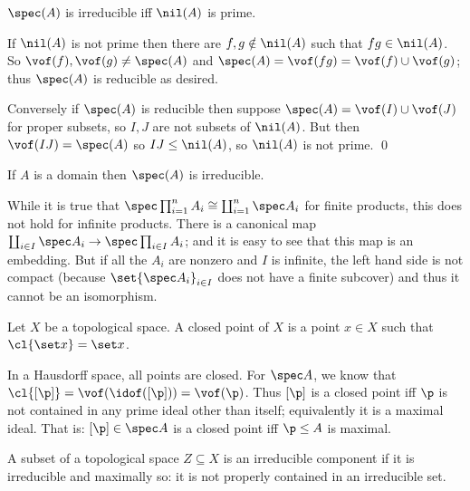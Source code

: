 \eproof

\bprop[name={irredaffine}]

    $\spec(A)$ is irreducible iff $\nil(A)$ is prime.

\eprop

\bproof

    If $\nil(A)$ is not prime then there are $f,g\notin\nil(A)$ such that $fg\in\nil(A)$.
    So $\vof(f),\vof(g)\neq\spec(A)$ and $\spec(A)=\vof(fg)=\vof(f)\cup\vof(g)$; thus $\spec(A)$ is reducible as desired.

    Conversely if $\spec(A)$ is reducible then suppose $\spec(A)=\vof(I)\cup\vof(J)$ for proper subsets, so $I,J$ are not subsets of $\nil(A)$.
    But then $\vof(IJ)=\spec(A)$ so $IJ\leq\nil(A)$, so $\nil(A)$ is not prime.
    \qed

\eproof

\bcoro[name={domspecirred}]

    If $A$ is a domain then $\spec(A)$ is irreducible.

\ecoro

\bnote

    While it is true that $\spec\prod_{i=1}^nA_i\cong\coprod_{i=1}^n\spec A_i$ for finite products, this does not hold for infinite products.
    There is a canonical map $\coprod_{i\in I}\spec A_i\to\spec\prod_{i\in I}A_i$; and it is easy to see that this map is an embedding.
    But if all the $A_i$ are nonzero and $I$ is infinite, the left hand side is not compact (because $\set{\spec A_i}_{i\in I}$ does not have a finite subcover) and thus it cannot be
    an isomorphism.

\enote

\bdefn

    Let $X$ be a topological space.
    A {\emphcolor closed point} of $X$ is a point $x\in X$ such that $\cl{\set x}=\set x$.

\edefn

In a Hausdorff space, all points are closed.
For $\spec A$, we know that $\cl{[\p]}=\vof(\idof([\p]))=\vof(\p)$.
Thus $[\p]$ is a closed point iff $\p$ is not contained in any prime ideal other than itself; equivalently it is a maximal ideal.
That is: $[\p]\in\spec A$ is a closed point iff $\p\leq A$ is maximal.

\bdefn

    A subset of a topological space $Z\subseteq X$ is an {\emphcolor irreducible component} if it is irreducible and maximally so: it is not properly contained in an irreducible set.

